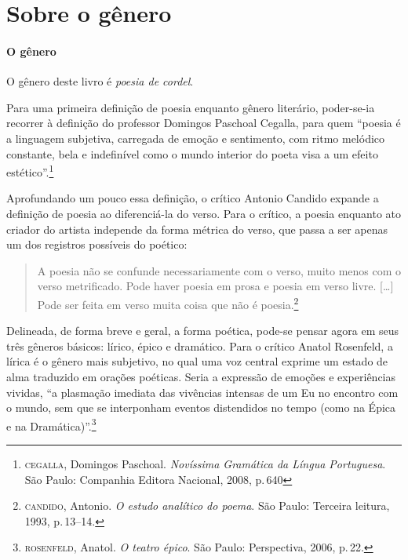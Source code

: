 \documentclass[11pt]{extarticle}
\begin{document}

\section{Sobre o gênero}

\paragraph{O gênero} O gênero deste livro é \textit{poesia de cordel}. 


Para uma primeira definição de poesia enquanto gênero literário, poder-se-ia recorrer à definição do professor Domingos Paschoal Cegalla, para quem ``poesia é a linguagem subjetiva, carregada de emoção e sentimento, com ritmo melódico constante, bela e indefinível como o mundo interior do poeta visa a um efeito estético''.\footnote{\textsc{cegalla}, Domingos Paschoal. \textit{Novíssima Gramática da Língua Portuguesa}. São Paulo: Companhia Editora Nacional, 2008, p.\,640}

Aprofundando um pouco essa definição, o crítico Antonio Candido expande a definição de poesia ao diferenciá-la do verso.
Para o crítico, a poesia enquanto ato criador do artista independe da forma métrica do verso, que passa a ser apenas um dos registros possíveis do poético:

\begin{quote}
A poesia não se confunde necessariamente com o verso, muito menos com o verso metrificado. Pode haver poesia em prosa e poesia em verso livre. [\ldots]
Pode ser feita em verso muita coisa que não é poesia.\footnote{\textsc{candido}, Antonio. \textit{O estudo analítico do poema}. São Paulo: Terceira leitura, 1993, p.\,13--14.}
\end{quote}

Delineada, de forma breve e geral, a forma poética, pode-se pensar agora em seus três gêneros básicos: lírico, épico e dramático.
Para o crítico Anatol Rosenfeld, a lírica é o gênero mais subjetivo, no qual uma voz central exprime um estado de alma traduzido em orações poéticas.
Seria a expressão de emoções e experiências vividas, ``a plasmação imediata das vivências intensas de um Eu no encontro com o mundo, sem que se interponham eventos distendidos no tempo (como na Épica e na Dramática)''.\footnote{\textsc{rosenfeld}, Anatol. \textit{O teatro épico}. São Paulo: Perspectiva, 2006, p.\,22.}
\end{document}
